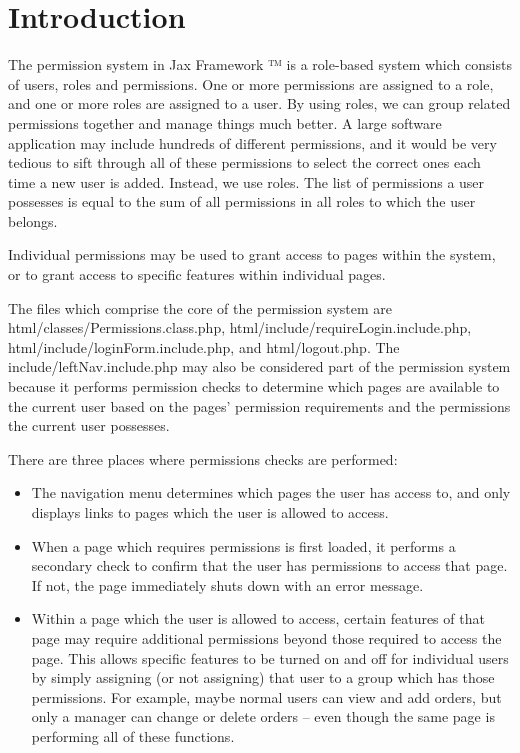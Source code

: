 \documentclass[letterpaper,10pt,english]{sphinxmanual}
\begin{document}
\section{Introduction}
\label{jaxFrameworkGuide:id23}
The permission system in Jax Framework ™ is a role-based system which consists of users, roles
and permissions.  One or more permissions are assigned to a role, and one or more roles are assigned
to a user.  By using roles, we can group related permissions together and manage things much better.
A large software application may include hundreds of different permissions, and it would be very
tedious to sift through all of these permissions to select the correct ones each time a new user is
added.  Instead, we use roles.  The list of permissions a user possesses is equal to the sum of all
permissions in all roles to which the user belongs.

Individual permissions may be used to grant access to pages within the system, or to grant access to
specific features within individual pages.

The files which comprise the core of the permission system are html/classes/Permissions.class.php,
html/include/requireLogin.include.php, html/include/loginForm.include.php, and html/logout.php.  The
include/leftNav.include.php may also be considered part of the permission system because it performs
permission checks to determine which pages are available to the current user based on the pages'
permission requirements and the permissions the current user possesses.

There are three places where permissions checks are performed:
\begin{itemize}
\item {} 
The navigation menu determines which pages the user has access to, and only displays links to
pages which the user is allowed to access.

\item {} 
When a page which requires permissions is first loaded, it performs a secondary check to confirm
that the user has permissions to access that page.  If not, the page immediately shuts down with
an error message.

\item {} 
Within a page which the user is allowed to access, certain features of that page may require
additional permissions beyond those required to access the page.  This allows specific features to
be turned on and off for individual users by simply assigning (or not assigning) that user to a
group which has those permissions.  For example, maybe normal users can view and add orders, but
only a manager can change or delete orders -- even though the same page is performing all of these
functions.

\end{itemize}
\end{document}
